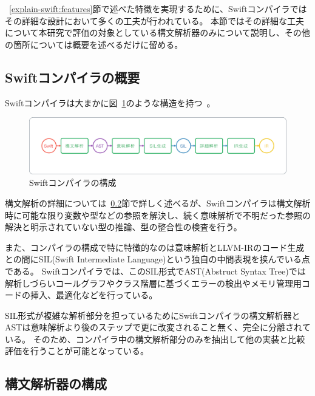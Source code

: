 ~\ref{explain-swift:features}節で述べた特徴を実現するために、Swiftコンパイラではその詳細な設計において多くの工夫が行われている。
本節ではその詳細な工夫について本研究で評価の対象としている構文解析器のみについて説明し、その他の箇所については概要を述べるだけに留める。

\subsection{Swiftコンパイラの概要}

Swiftコンパイラは大まかに図~\ref{img:swift-compile-process}のような構造を持つ~\cite{sil}。

\begin{figure}
    \begin{center}
        \includegraphics[scale=0.30]{./img/swift_compile_process}
        \caption{Swiftコンパイラの構成}
        \label{img:swift-compile-process}
    \end{center}
\end{figure}

構文解析の詳細については~\ref{explain-swift:structure:parser}節で詳しく述べるが、Swiftコンパイラは構文解析時に可能な限り変数や型などの参照を解決し、続く意味解析で不明だった参照の解決と明示されていない型の推論、型の整合性の検査を行う。

また、コンパイラの構成で特に特徴的なのは意味解析とLLVM-IRのコード生成との間にSIL(Swift Intermediate Language)という独自の中間表現を挟んでいる点である。
Swiftコンパイラでは、このSIL形式でAST(Abstruct Syntax Tree)では解析しづらいコールグラフやクラス階層に基づくエラーの検出やメモリ管理用コードの挿入、最適化などを行っている。

SIL形式が複雑な解析部分を担っているためにSwiftコンパイラの構文解析器とASTは意味解析より後のステップで更に改変されること無く、完全に分離されている。
そのため、コンパイラ中の構文解析部分のみを抽出して他の実装と比較評価を行うことが可能となっている。


\subsection{構文解析器の構成}
\label{explain-swift:structure:parser}

